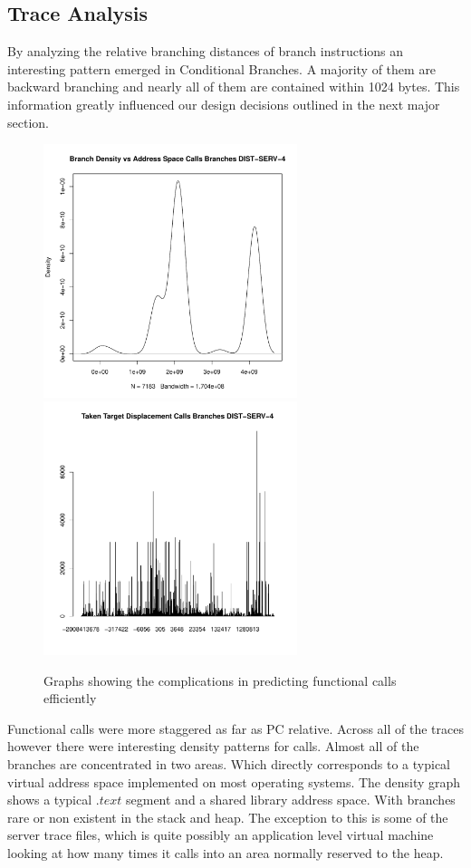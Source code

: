 \subsection{Trace Analysis}
By analyzing the relative branching distances of branch instructions an interesting pattern emerged in Conditional Branches. A majority of them are backward branching and nearly all of them are contained within 1024 bytes. This information greatly influenced our design decisions outlined in the next major section.
\begin{figure}
\begin{center} 
\includegraphics[width=7.4cm]{"./Calls Branches DIST-SERV-4-density"}
\includegraphics[width=7.4cm]{"./Calls Branches DIST-SERV-4-histogram"}
\caption{Graphs showing the complications in predicting functional calls efficiently}
\end{center}
\end{figure}
Functional calls were more staggered as far as PC relative. Across all of the traces however there were interesting density patterns for calls. Almost all of the branches are concentrated in two areas. Which directly corresponds to a typical virtual address space implemented on most operating systems. The density graph shows a typical $.text$ segment and a shared library address space. With branches rare or non existent in the stack and heap. The exception to this is some of the server trace files, which is quite possibly an application level virtual machine looking at how many times it calls into an area normally reserved to the heap.


